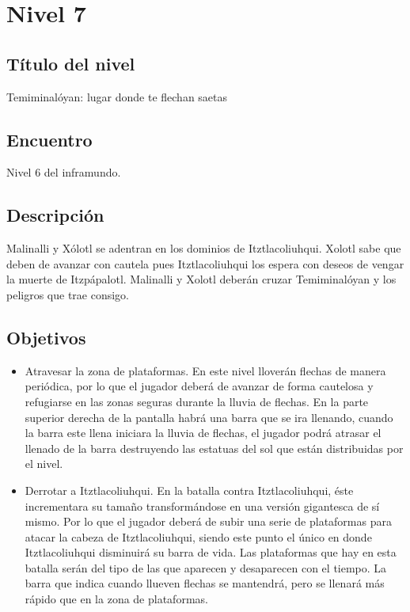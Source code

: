 \section{Nivel 7}  \label{Nivel:Niv07}
	\subsection{Título del nivel}
	Temiminalóyan: lugar donde te flechan saetas
	\subsection{Encuentro}
	Nivel 6 del inframundo.
	\subsection{Descripción}
	Malinalli y Xólotl se adentran en los dominios de Itztlacoliuhqui. Xolotl sabe que deben de avanzar con cautela pues Itztlacoliuhqui los espera con deseos de vengar la muerte de Itzpápalotl. Malinalli y Xolotl deberán cruzar Temiminalóyan y los peligros que trae consigo.
	\subsection{Objetivos}
	\begin{itemize}
		\item Atravesar la zona de plataformas. En este nivel lloverán flechas de manera periódica, por lo que el jugador deberá de avanzar de forma cautelosa y refugiarse en las zonas seguras durante la lluvia de flechas. En la parte superior derecha de la pantalla habrá una barra que se ira llenando, cuando la barra este llena iniciara la lluvia de flechas, el jugador podrá atrasar el llenado de la barra destruyendo las estatuas del sol que están distribuidas por el nivel.  
		\item Derrotar a Itztlacoliuhqui. En la batalla contra Itztlacoliuhqui, éste incrementara su tamaño transformándose en una versión gigantesca de sí mismo.  Por lo que el jugador deberá de subir una serie de plataformas para atacar la cabeza de Itztlacoliuhqui, siendo este punto el único en donde Itztlacoliuhqui disminuirá su barra de vida. Las plataformas que hay en esta batalla serán del tipo de las que aparecen y desaparecen con el tiempo. La barra que indica cuando llueven flechas se mantendrá, pero se llenará más rápido que en la zona de plataformas.
	\end{itemize}

